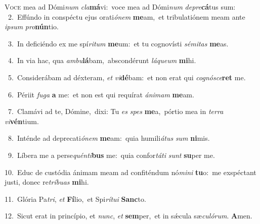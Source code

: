\lettrine{\initial\textcolor{\initialcolor}{V}}{oce} mea ad Dómi\textit{num} \textit{cla}\-\textbf{má}vi:~\star voce mea ad Dómi\textit{num} \textit{de}\-\textit{pre}\textbf{cá}tus sum:\\
{\numbfont\textcolor{\numbcolor}{~2.}}~Effúndo in conspéctu ejus orati\-\textit{ó}\-\textit{nem} \textbf{me}\-am,~\star et tribulatiónem meam ante \textit{ip}\-\textit{sum} \textit{pro}\-\textbf{nún}tio.\par
{\numbfont\textcolor{\numbcolor}{~3.}}~In deficiéndo ex me spí\-\textit{ri}\-\textit{tum} \textbf{me}\-um:~\star et tu cognovísti \textit{sé}\-\textit{mi}\textit{tas} \textbf{me}\-as.\par
{\numbfont\textcolor{\numbcolor}{~4.}}~In via hac, qua \textit{am}\-\textit{bu}\textbf{lá}bam,~\star abscondérunt \textit{lá}\-\textit{que}\textit{um} \textbf{mi}\-hi.\par
{\numbfont\textcolor{\numbcolor}{~5.}}~Considerábam ad déxteram, \textit{et} \textit{vi}\-\textbf{dé}bam:~\star et non erat qui \textit{co}\-\textit{gnó}\textit{sce}\textbf{ret} me.\par
{\numbfont\textcolor{\numbcolor}{~6.}}~Périit \textit{fu}\-\textit{ga} \textbf{a} me:~\star et non est qui requírat \textit{á}\-\textit{ni}\textit{mam} \textbf{me}\-am.\par
{\numbfont\textcolor{\numbcolor}{~7.}}~Clamávi ad te, Dómine,~\dagger dixi: Tu \textit{es} \textit{spes} \textbf{me}\-a,~\star pórtio mea in \textit{ter}\-\textit{ra} \textit{vi}\-\textbf{vén}tium.\par
{\numbfont\textcolor{\numbcolor}{~8.}}~Inténde ad deprecati\-\textit{ó}\-\textit{nem} \textbf{me}\-am:~\star quia humili\-\textit{á}\-\textit{tus} \textit{sum} \textbf{ni}\-mis.\par
{\numbfont\textcolor{\numbcolor}{~9.}}~Líbera me a perse\-\textit{quén}\-\textit{ti}\textbf{bus} me:~\star quia confor\-\textit{tá}\-\textit{ti} \textit{sunt} \textbf{su}\-per me.\par
{\numbfont\textcolor{\numbcolor}{10.}}~Educ de custódia ánimam meam ad confiténdum nó\-\textit{mi}\-\textit{ni} \textbf{tu}\-o:~\star me exspéctant justi, donec re\-\textit{trí}\-\textit{bu}\textit{as} \textbf{mi}\-hi.\par
{\numbfont\textcolor{\numbcolor}{11.}}~Glória Pa\-\textit{tri}\-, \textit{et} \textbf{Fí}\-lio,~\star et Spi\-\textit{rí}\-\textit{tu}\textit{i} \textbf{Sanc}\-to.\par
{\numbfont\textcolor{\numbcolor}{12.}}~Sicut erat in princípio, et \textit{nunc}\-, \textit{et} \textbf{sem}\-per,~\star et in sǽcula sæ\-\textit{cu}\-\textit{ló}\textit{rum}. \textbf{A}\-men.\par

